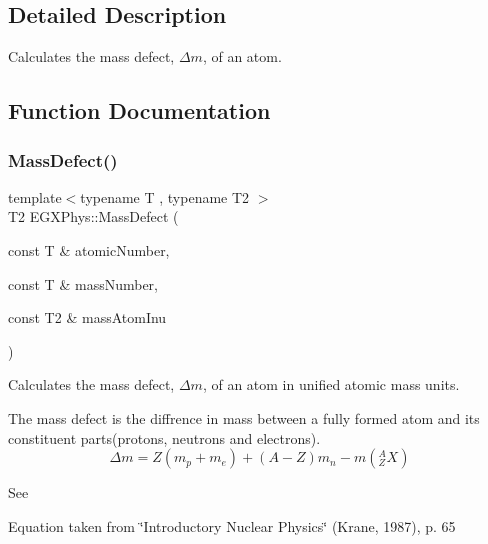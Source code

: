 \subsection{Detailed Description}
Calculates the mass defect, $\Delta m$, of an atom. 

\subsection{Function Documentation}
\mbox{\label{group___mass_defect_gae89f2dfa65992c0314adc2440b2f582a}} 
\subsubsection{\texorpdfstring{Mass\+Defect()}{MassDefect()}}
{\footnotesize\ttfamily template$<$typename T , typename T2 $>$ \\
T2 E\+G\+X\+Phys\+::\+Mass\+Defect (\begin{DoxyParamCaption}\item[{const T \&}]{atomic\+Number,  }\item[{const T \&}]{mass\+Number,  }\item[{const T2 \&}]{mass\+Atom\+Inu }\end{DoxyParamCaption})}



Calculates the mass defect, $\Delta m$, of an atom in unified atomic mass units. 

The mass defect is the diffrence in mass between a fully formed atom and its constituent parts(protons, neutrons and electrons). \[\Delta m = Z(m_p + m_e)+(A-Z)m_n - m({^A_ZX})\]

See

Equation taken from \char`\"{}\+Introductory Nuclear Physics\char`\"{} (Krane, 1987), p. 65


